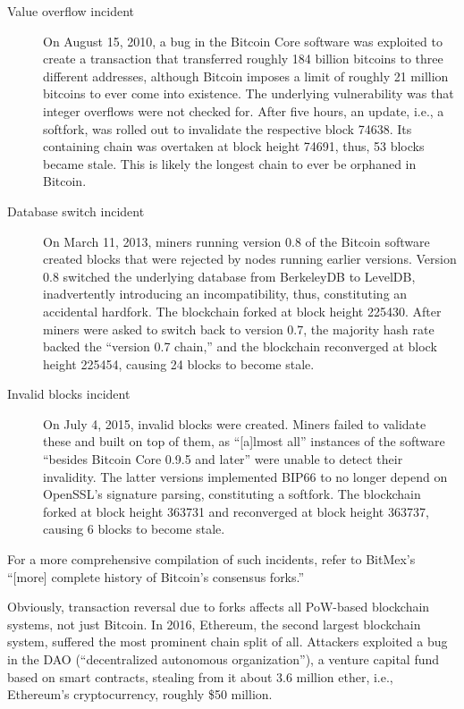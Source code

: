 \begin{description}
	\item[Value overflow incident]
		On August 15, 2010, a bug in the Bitcoin Core software was exploited to create a transaction that transferred roughly 184 billion bitcoins to three different addresses, although Bitcoin imposes a limit of roughly 21 million bitcoins to ever come into existence.
		The underlying vulnerability was that integer overflows were not checked for.
		After five hours, an update, i.e., a softfork, was rolled out to invalidate the respective block 74638.
		Its containing chain was overtaken at block height 74691, thus, 53 blocks became stale.
		\autocite{bitcoinwiki2016valueoverflowincident}
		This is likely the longest chain to ever be orphaned in Bitcoin.
	\item[Database switch incident]
		On March 11, 2013, miners running version 0.8 of the Bitcoin software created blocks that were rejected by nodes running earlier versions.
		Version 0.8 switched the underlying database from BerkeleyDB to LevelDB, inadvertently introducing an incompatibility, thus, constituting an accidental hardfork.
		The blockchain forked at block height 225430.
		After miners were asked to switch back to version 0.7, the majority hash rate backed the ``version 0.7 chain,'' and the blockchain reconverged at block height 225454, causing 24 blocks to become stale.
		\autocite{bitcoinmag2013bitcoinfork}
	\item[Invalid blocks incident]
		On July 4, 2015, invalid blocks were created.
		Miners failed to validate these and built on top of them, as ``[a]lmost all''  instances of the software ``besides Bitcoin Core 0.9.5 and later'' were unable to detect their invalidity. \autocite{bitcoin2015invalidblocks}
		The latter versions implemented BIP66 \autocite{github2015bitcoinbip66} to no longer depend on OpenSSL's signature parsing, constituting a softfork.
		The blockchain forked at block height 363731 and reconverged at block height 363737, causing 6 blocks to become stale.
		\autocite{reddit2015bitcoininvalidblocks}
\end{description}

For a more comprehensive compilation of such incidents, refer to BitMex's ``[more] complete history of Bitcoin's consensus forks.'' \autocite{bitmex2017bitcoinforkhistory}

Obviously, transaction reversal due to forks affects all PoW-based blockchain systems, not just Bitcoin.
In 2016, Ethereum, the second largest blockchain system, suffered the most prominent chain split of all.
Attackers exploited a bug in the DAO (``decentralized autonomous organization''), a venture capital fund based on smart contracts, stealing from it about 3.6 million ether, i.e., Ethereum's cryptocurrency, roughly \$50 million. \autocite[75]{dhillon2017}

